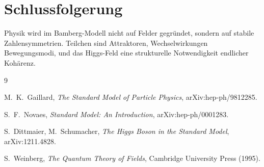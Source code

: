 \documentclass[11pt,a4paper]{article}
\begin{document}
\section{Schlussfolgerung}

Physik wird im Bamberg-Modell
nicht auf Felder gegründet,
sondern auf stabile Zahlensymmetrien.
Teilchen sind Attraktoren,
Wechselwirkungen Bewegungsmodi,
und das Higgs-Feld
eine strukturelle Notwendigkeit
endlicher Kohärenz.

\begin{thebibliography}{9}

M.~K.~Gaillard,
\emph{The Standard Model of Particle Physics},
arXiv:hep-ph/9812285.

S.~F.~Novaes,
\emph{Standard Model: An Introduction},
arXiv:hep-ph/0001283.

S.~Dittmaier, M.~Schumacher,
\emph{The Higgs Boson in the Standard Model},
arXiv:1211.4828.

S.~Weinberg,
\emph{The Quantum Theory of Fields},
Cambridge University Press (1995).

\end{thebibliography}
\end{document}
